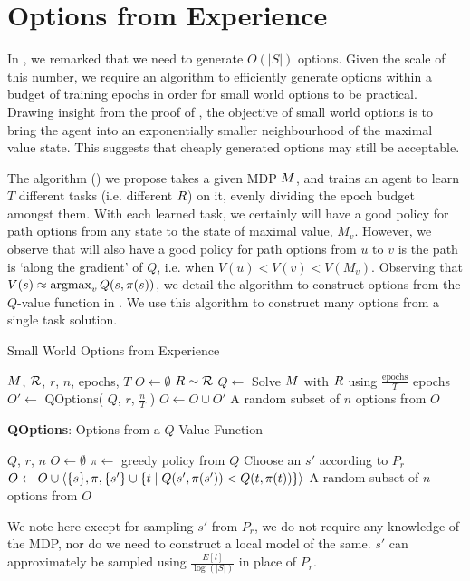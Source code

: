 \section{Options from Experience} 
\label{sec:algo}

In , we remarked that we need to generate $O(|S|)$
options. Given the scale of this number, we require an algorithm to
efficiently generate options within a budget of training epochs in order
for small world options to be practical. Drawing insight from the proof
of , the objective of small world options is to
bring the agent into an exponentially smaller neighbourhood of the
maximal value state. This suggests that cheaply generated options may
still be acceptable.

The algorithm () we propose takes
a given MDP $M$, and trains an agent to learn $T$ different tasks
(i.e. different $R$) on it, evenly dividing the epoch budget
amongst them. With each learned task, we certainly will have a good policy
for path options from any state to the state of maximal value, $M_v$.
However, we observe that will also have a good policy for path options
from $u$ to $v$ is the path is `along the gradient' of $Q$, i.e. when
$V(u) < V(v) < V(M_v)$. Observing that $V(s) \approx \operatorname{argmax}_{v}
Q(s,\pi(s))$, we detail the algorithm to construct options from the
$Q$-value function in . We use this algorithm to
construct many options from a single task solution.

\begin{algorithm}[H]
  \caption{Small World Options from Experience}
  \label{algo:small-world-experience}
  \begin{algorithmic}[1]
      \REQUIRE $M$, $\mathcal{R}$, $r$, $n$, epochs, $T$
      \STATE $O \gets \emptyset$
        \STATE $R \sim \mathcal{R}$
        \STATE $Q \gets $ Solve $M$ with $R$ using
            $\frac{\textrm{epochs}}{T}$ epochs
        \STATE $O' \gets $ QOptions( $Q$, $r$,
            $\frac{n}{T}$ )
        \STATE $O \gets O \cup O'$
      \ENDFOR
      \RETURN A random subset of $n$ options from $O$
  \end{algorithmic}
\end{algorithm}
\begin{algorithm}[H]
  \caption{{\bf QOptions}: Options from a $Q$-Value Function}
  \label{algo:qoptions}
  \begin{algorithmic}[1]
      \REQUIRE $Q$, $r$, $n$
      \STATE $O \gets \emptyset$
      \STATE $\pi \gets $ greedy policy from $Q$
        \STATE Choose an $s'$ according to $P_r$
          \STATE $O \gets O \cup \langle \{s\}, \pi, \{s'\} \cup \{t \mid Q(s',\pi(s')) < Q(t, \pi(t))\}  \rangle$
        \ENDIF
      \RETURN A random subset of $n$ options from $O$
  \end{algorithmic}
\end{algorithm}

We note here except for sampling $s'$ from $P_r$, we do not require any
knowledge of the MDP, nor do we need to construct a local model of the
same. $s'$ can approximately be sampled using $\frac{E[l]}{\log(|S|)}$
in place of $P_r$. 

